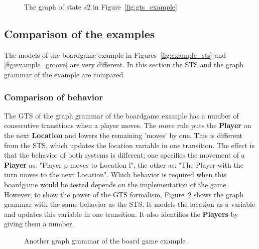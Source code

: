 \begin{figure}[h!]
  \begin{center}
    
  \end{center}
  \caption{The graph of state $s2$ in Figure~\ref{fig:gts_example}}
  \label{fig:target_graph_state}
\end{figure}

\subsection{Comparison of the examples}\label{sec:comparison}
The models of the boardgame example in Figures~\ref{fig:example_sts} and \ref{fig:example_groove} are very different. In this section the STS and the graph grammar of the example are compared.

\subsubsection{Comparison of behavior}
The GTS of the graph grammar of the boardgame example has a number of consecutive transitions when a player moves. The $move$ rule puts the \textbf{Player} on the next \textbf{Location} and lowers the remaining 'moves' by one. This is different from the STS, which updates the location variable in one transition. The effect is that the behavior of both systems is different; one specifies the movement of a \textbf{Player} as: "Player p moves to Location l", the other as: "The Player with the turn moves to the next Location". Which behavior is required when this boardgame would be tested depends on the implementation of the game. However, to show the power of the GTS formalism, Figure~\ref{fig:example_groove2} shows the graph grammar with the same behavior as the STS. It models the location as a variable and updates this variable in one transition. It also identifies the \textbf{Players} by giving them a number.

\begin{figure}[h]
  \begin{center}
    \quad
  \end{center}
  \caption{Another graph grammar of the board game example}
  \label{fig:example_groove2}
\end{figure}

